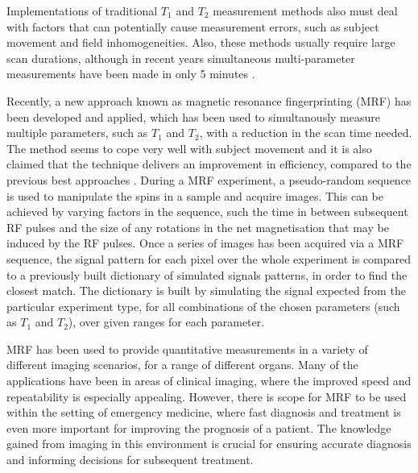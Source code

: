 \documentclass[journal]{IEEEtran}
\begin{document}
Implementations of traditional $T_1$ and $T_2$ measurement methods also must deal with factors that can potentially cause measurement errors, such as subject movement and field inhomogeneities. Also, these methods usually require large scan durations, although in recent years simultaneous multi-parameter measurements have been made in only 5 minutes \cite{warntjes2008rapid}. %

Recently, a new approach known as magnetic resonance fingerprinting (MRF) has been developed and applied, which has been used to simultanously measure multiple parameters, such as $T_1$ and $T_2$, with a reduction in the scan time needed. The method seems to cope very well with subject movement and it is also claimed that the technique delivers an improvement in efficiency, compared to the previous best approaches \cite{ma2013magnetic, deoni2005high}. During a MRF experiment, a pseudo-random sequence is used to manipulate the spins in a sample and acquire images. This can be achieved by varying factors in the sequence, such the time in between subsequent RF pulses and the size of any rotations in the net magnetisation that may be induced by the RF pulses. Once a series of images has been acquired via a MRF sequence, the signal pattern for each pixel over the whole experiment is compared to a previously built dictionary of simulated signals patterns, in order to find the closest match. The dictionary is built by simulating the signal expected from the particular experiment type, for all combinations of the chosen parameters (such as $T_1$ and $T_2$), over given ranges for each parameter.

MRF has been used to provide quantitative measurements in a variety of different imaging scenarios, for a range of different organs. Many of the applications have been in areas of clinical imaging, where the improved speed and repeatability is especially appealing. However, there is scope for MRF to be used within the setting of emergency medicine, where fast diagnosis and treatment is even more important for improving the prognosis of a patient.
The knowledge gained from imaging in this environment is crucial for ensuring accurate diagnosis and informing decisions for subsequent treatment.  
\end{document}
